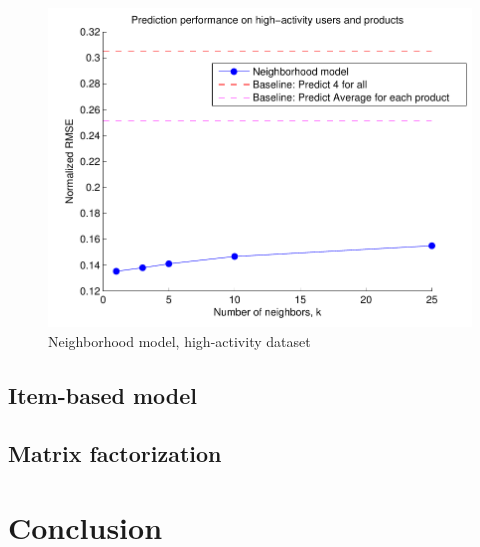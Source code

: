 \documentclass[letterpaper, 10 pt, conference]{ieeeconf}
\begin{document}
\begin{figure}[h]
\includegraphics[scale=0.6]{images/modelone_subset.pdf}
\caption{Neighborhood model, high-activity dataset}
\label{fig:modelone_subset}
\end{figure}

\subsection{Item-based model}
\subsection{Matrix factorization}

\section{Conclusion}
\end{document}
